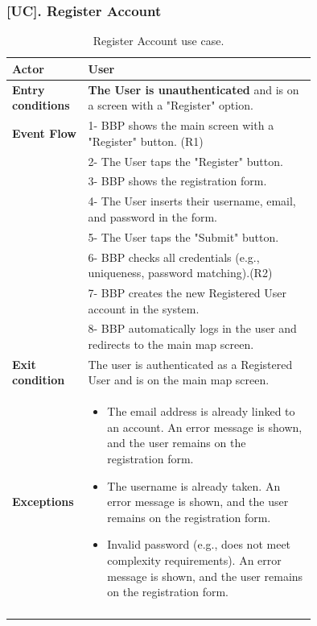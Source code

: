 \subsubsection*{[UC\cuc]. Register Account}
\begin{center}
    \begin{longtable}{|l|p{0.75\linewidth}|}
        \hline
        \textbf{Actor}          & \textbf{User} \\
        \hline
        \textbf{Entry conditions} & \textbf{The User is unauthenticated} and is on a screen with a "Register" option. \\
        \hline
        \textbf{Event Flow}     & 1- BBP shows the main screen with a "Register" button. (R1) \\
                            & 2- The User taps the "Register" button. \\
                            & 3- BBP shows the registration form. \\
                            & 4- The User inserts their username, email, and password in the form. \\
                            & 5- The User taps the "Submit" button. \\
                            & 6- BBP checks all credentials (e.g., uniqueness, password matching).(R2) \\
                            & 7- BBP creates the new Registered User account in the system. \\
                            & 8- BBP automatically logs in the user and redirects to the main map screen. \\
        \hline
        \textbf{Exit condition}   & The user is authenticated as a Registered User and is on the main map screen. \\
        \hline
        \textbf{Exceptions}     & \begin{itemize}[noitemsep, nolistsep]
                                \item The email address is already linked to an account. An error message is shown, and the user remains on the registration form.
                                \item The username is already taken. An error message is shown, and the user remains on the registration form.
                                \item Invalid password (e.g., does not meet complexity requirements). An error message is shown, and the user remains on the registration form.
                            \end{itemize} \\
        \hline
        \caption{Register Account use case.}
        \label{tab:uc_register}
    \end{longtable}
\end{center}

